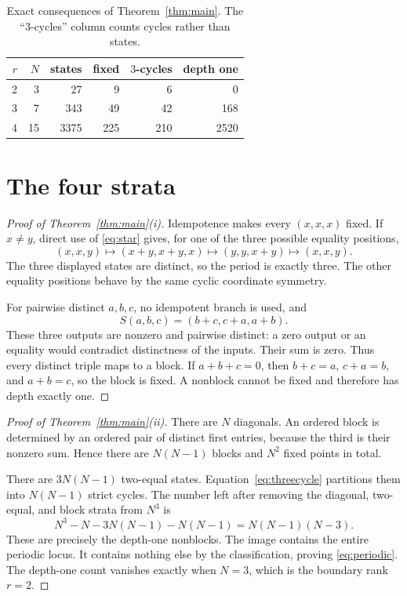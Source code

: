 \documentclass[a4paper,10pt]{amsart}
\theoremstyle{remark}
\begin{document}
\begin{table}[ht]
\centering
\small
\caption{Exact consequences of Theorem~\ref{thm:main}.  The ``$3$-cycles''
column counts cycles rather than states.}
\label{tab:ranks}
\begin{tabular}{@{}rrrrrr@{}}
\toprule
$r$ & $N$ & states & fixed & $3$-cycles & depth one \\
\midrule
2 & 3  & 27   & 9   & 6   & 0 \\
3 & 7  & 343  & 49  & 42  & 168 \\
4 & 15 & 3375 & 225 & 210 & 2520 \\
\bottomrule
\end{tabular}
\end{table}

\section{The four strata}\label{sec:strata}

\begin{proof}[Proof of Theorem~\ref{thm:main}(i)]
Idempotence makes every $(x,x,x)$ fixed.  If $x\ne y$, direct use of
\eqref{eq:star} gives, for one of the three possible equality positions,
\begin{equation}\label{eq:threecycle}
 (x,x,y)\mapsto(x+y,x+y,x)\mapsto(y,y,x+y)\mapsto(x,x,y).
\end{equation}
The three displayed states are distinct, so the period is exactly three.
The other equality positions behave by the same cyclic coordinate symmetry.

For pairwise distinct $a,b,c$, no idempotent branch is used, and
\begin{equation}\label{eq:linearbranch}
 S(a,b,c)=(b+c,c+a,a+b).
\end{equation}
These three outputs are nonzero and pairwise distinct: a zero output or an
equality would contradict distinctness of the inputs.  Their sum is zero.
Thus every distinct triple maps to a block.  If $a+b+c=0$, then
$b+c=a$, $c+a=b$, and $a+b=c$, so the block is fixed.  A nonblock cannot be
fixed and therefore has depth exactly one.
\end{proof}

\begin{proof}[Proof of Theorem~\ref{thm:main}(ii)]
There are $N$ diagonals.  An ordered block is determined by an ordered pair
of distinct first entries, because the third is their nonzero sum.  Hence
there are $N(N-1)$ blocks and $N^2$ fixed points in total.

There are $3N(N-1)$ two-equal states.  Equation~\eqref{eq:threecycle}
partitions them into $N(N-1)$ strict cycles.  The number left after removing
the diagonal, two-equal, and block strata from $N^3$ is
\[
 N^3-N-3N(N-1)-N(N-1)=N(N-1)(N-3).
\]
These are precisely the depth-one nonblocks.  The image contains the entire
periodic locus.  It contains nothing else by the classification, proving
\eqref{eq:periodic}.  The depth-one count vanishes exactly when $N=3$, which
is the boundary rank $r=2$.
\end{proof}
\end{document}
